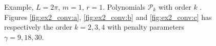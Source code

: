 \begin{figure}
    \caption{ Example, $L=2\pi$, $m=1$, $r=1$. Polynomials $\mathcal{P}_{k} $ with order $k$ . Figures \ref{fig:ex2_conv:a}, \ref{fig:ex2_conv:b} and \ref{fig:ex2_conv:c} has respectively the order $k=2,3, 4$ with penalty parameters $\gamma = 9,18,30 $.  }
    \label{fig:ex2_conv}
\end{figure}



